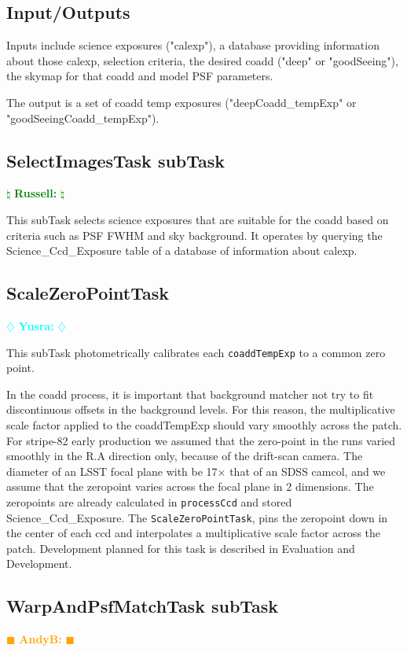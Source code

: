 \documentclass[12pt]{article}
\newcommand{\becker} { \textcolor{orange} {
\ensuremath{\blacksquare} {\bf AndyB:}  
\ensuremath{\blacksquare} } }
\newcommand{\yusra} { \textcolor{cyan} {
\ensuremath{\diamondsuit} {\bf Yusra:}  
\ensuremath{\diamondsuit} } }
\newcommand{\russ} { \textcolor{green} {
\ensuremath{\natural} {\bf Russell:}  
\ensuremath{\natural} } }
\begin{document}
\subsection{Input/Outputs}

Inputs include science exposures ("calexp"), a database providing information about
those calexp, selection criteria, the desired coadd ("deep" or "goodSeeing"),
the skymap for that coadd and model PSF parameters.

The output is a set of coadd temp exposures ("deepCoadd\_tempExp" or "goodSeeingCoadd\_tempExp").

\subsection{SelectImagesTask subTask} \russ

This subTask selects science exposures that are suitable for the coadd
based on criteria such as PSF FWHM and sky background. It operates by
querying the Science\_Ccd\_Exposure table of a database of information about calexp.

\subsection{ScaleZeroPointTask} \yusra

This subTask  photometrically calibrates each {\tt coaddTempExp} to a common zero point. 

In the coadd process, it is important that background matcher not try to fit discontinuous offsets in the background levels. For this reason, the multiplicative scale factor applied to the coaddTempExp should vary smoothly across the patch. For stripe-82 early production we assumed that the zero-point in the runs varied smoothly in the R.A direction only, because of the drift-scan camera.  The diameter of an LSST focal plane with be 17$\times$  that of an SDSS camcol, and we assume that the zeropoint varies across the focal plane in 2 dimensions.  The zeropoints are already calculated in {\tt processCcd} and stored Science\_Ccd\_Exposure. The {\tt ScaleZeroPointTask}, pins the zeropoint down in the center of each ccd and interpolates a multiplicative scale factor across the patch.  Development planned for this task is described in 
Evaluation and Development. 

\subsection{WarpAndPsfMatchTask subTask} \becker
\end{document}
